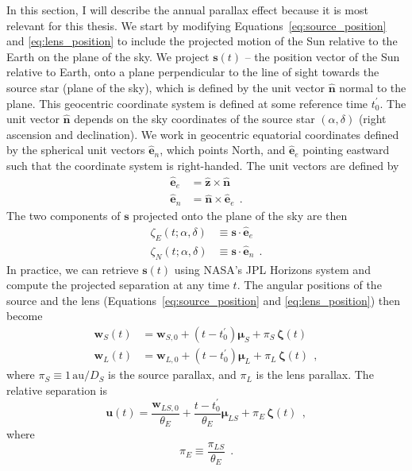 \documentclass[12pt,dvipsnames]{report}
\renewcommand{\vec}[1]{\boldsymbol{\mathbf{#1}}}
\newcommand{\hquad}{~~}
\begin{document}
In this section, I will describe the annual parallax effect because it is most relevant
for this thesis. We start by
modifying Equations~\ref{eq:source_position} and \ref{eq:lens_position} to
include the projected motion of the Sun relative to the Earth on the plane of
the sky. We project $\mathbf s(t)$ -- the position vector of the Sun relative to
Earth, onto a plane perpendicular to the line of sight towards the source star
(plane of the sky), which is defined by the unit vector $\boldsymbol{\hat n}$
normal to the plane. This geocentric coordinate system is defined at some reference time
$t_0^\prime$.  The unit vector $\boldsymbol{\hat n}$ depends on the sky
coordinates of the source star $(\alpha,\delta)$ (right ascension and
declination). We work in geocentric equatorial coordinates defined by
the spherical unit vectors $\hat{\mathbf e}_n$, which points North, and
$\hat{\mathbf e}_e$ pointing eastward such that the coordinate system is
right-handed. The unit vectors are defined by
\begin{align}
    \hat{\mathbf e}_e & = \hat{\mathbf z}\times \hat{\mathbf n}  \\
    \hat{\mathbf e}_n & = \hat{\mathbf n}\times\hat{\mathbf e}_e
    \hquad.
\end{align}
The two components of $\mathbf s$ projected onto the plane of the sky are then
\begin{align}
    \zeta_E(t;\alpha,\delta)&\equiv \mathbf s\cdot \hat{\mathbf e}_e
    \label{eq:zeta_E_t}\\
    \zeta_N(t;\alpha,\delta)&\equiv \mathbf s\cdot \hat{\mathbf e}_n
    \hquad.
    \label{eq:zeta_N_t}
\end{align}
In practice, we can retrieve $\mathbf{s}(t)$ using NASA's JPL Horizons system and compute
the projected separation at any time $t$. 
The angular positions of the source and the lens
(Equations~\ref{eq:source_position} and \ref{eq:lens_position}) then become
\begin{align}
    \vec{w}_S(t) & = \vec{w}_{S,0}+(t-t_0^\prime)\boldsymbol{\mu}_S
    +\pi_S\,\boldsymbol{\zeta}(t)                            \\
    \vec{w}_L(t) & = \vec{w}_{L,0}+(t-t_0^\prime)\boldsymbol{\mu}_L
    +\pi_L\,\boldsymbol{\zeta}(t)
    \hquad,
\end{align}
where  $\pi_S\equiv 1\,\mathrm{au}/D_S$ is the source parallax, and $\pi_L$ is the
lens parallax.
The relative separation is 
\begin{equation}
    \boldsymbol{u}(t)= \frac{\vec{w}_{LS, 0}}{\theta_E}
    +\frac{t-t_0^\prime}{\theta_E}\boldsymbol{\mu}_{LS}+\pi_{E}\,\boldsymbol{\zeta}(t)
    \hquad,
    \label{eq:relative_separation_parallax}
\end{equation}
where
\begin{equation}
    \pi_E\equiv \frac{\pi_{LS}}{\theta_E}
    \hquad.
    \label{eq:pi_E}
\end{equation}
\end{document}
